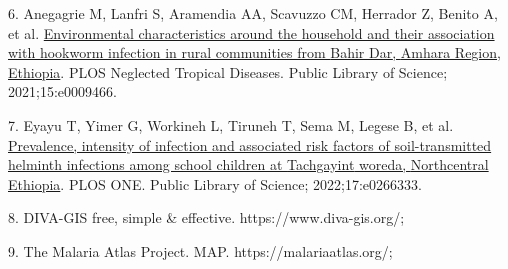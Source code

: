 \documentclass[
]{article}
\newlength{\cslhangindent}
\newlength{\cslentryspacingunit} %
\newenvironment{CSLReferences}[2] %
 {%
  \setlength{\parindent}{0pt}
  \ifodd #1
  \let\oldpar\par
  \def\par{\hangindent=\cslhangindent\oldpar}
  \fi
  \setlength{\parskip}{#2\cslentryspacingunit}
 }%
 {}
\begin{document}
\begin{CSLReferences}{0}{0}
\leavevmode{}%
6. Anegagrie M, Lanfri S, Aramendia AA, Scavuzzo CM, Herrador Z, Benito
A, et al.
\href{https://doi.org/10.1371/journal.pntd.0009466}{Environmental
characteristics around the household and their association with hookworm
infection in rural communities from {Bahir Dar}, {Amhara Region},
{Ethiopia}}. PLOS Neglected Tropical Diseases. {Public Library of
Science}; 2021;15:e0009466.

\leavevmode{}%
7. Eyayu T, Yimer G, Workineh L, Tiruneh T, Sema M, Legese B, et al.
\href{https://doi.org/10.1371/journal.pone.0266333}{Prevalence,
intensity of infection and associated risk factors of soil-transmitted
helminth infections among school children at {Tachgayint} woreda,
{Northcentral Ethiopia}}. PLOS ONE. {Public Library of Science};
2022;17:e0266333.

\leavevmode{}%
8. {DIVA-GIS} \textbar{} free, simple \& effective.
https://www.diva-gis.org/;

\leavevmode{}%
9. The {Malaria Atlas Project}. MAP. https://malariaatlas.org/;

\end{CSLReferences}
\end{document}
